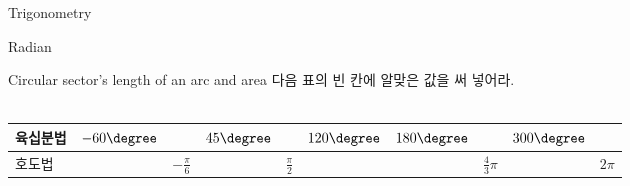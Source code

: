 
\begin{edXchapter}{Trigonometry}
\begin{edXsection}{Radian}
\begin{edXvertical}


\begin{edXproblem}{Circular sector's length of an arc and area }
다음 표의 빈 칸에 알맞은 값을 써 넣어라.\\ \\
	
\begin{tabu} to 0.9\textwidth { | X[m,c] || X[m,c] | X[m,c] | X[m,c] | X[m,c] | X[m,c] | X[m,c] | X[m,c] | X[m,c] | X[m,c] | }
	\hline
	육십분법 & $-60\degree$ &  & $45\degree$ &  & $120\degree$  & $180\degree$&  & $300\degree$  &  \\
	\hline
	호도법  &   & {\Large$-\frac{\pi}{6}$} &  & {\Large$\frac{\pi}{2}$} &   &   & {\Large$\frac{4}{3}\pi$} &   & $2\pi$ \\
	\hline
\end{tabu}


\begin{edXsolution}

\end{edXsolution}

\end{edXproblem}


\end{edXvertical}
\end{edXsection}
\end{edXchapter}
